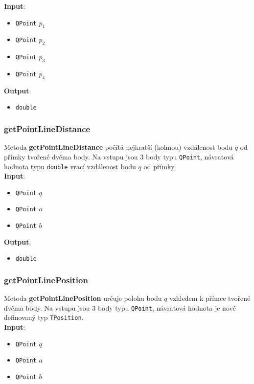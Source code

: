 \documentclass[a4paper, 12pt]{article}
\begin{document}
\textbf{Input}:
\begin{itemize}
\item \texttt{QPoint} $p_1$ 
\item \texttt{QPoint} $p_2$ 
\item \texttt{QPoint} $p_3$
\item \texttt{QPoint} $p_4$
\end{itemize}

\textbf{Output}:
\begin{itemize}
\item \texttt{double} 
\end{itemize}

\subsubsection*{getPointLineDistance}
Metoda \textbf{getPointLineDistance} počítá nejkratší (kolmou) vzdálenost bodu $q$ od přímky tvořené dvěma body. Na vstupu jsou 3 body typu \texttt{QPoint}, návratová hodnota typu \texttt{double} vrací vzdálenost bodu $q$ od přímky.\\ 

\textbf{Input}:
\begin{itemize}
\item \texttt{QPoint} $q$ 
\item \texttt{QPoint} $a$ 
\item \texttt{QPoint} $b$
\end{itemize}

\textbf{Output}:
\begin{itemize}
\item \texttt{double} 
\end{itemize}

\subsubsection*{getPointLinePosition}
Metoda \textbf{getPointLinePosition} určuje polohu bodu $q$ vzhledem k přímce tvořené dvěma body. Na vstupu jsou 3 body typu \texttt{QPoint}, návratová hodnota je nově definovaný typ \texttt{TPosition}.\\

\textbf{Input}:
\begin{itemize}
\item \texttt{QPoint} $q$
\item \texttt{QPoint} $a$
\item \texttt{QPoint} $b$
\end{itemize}
\end{document}
